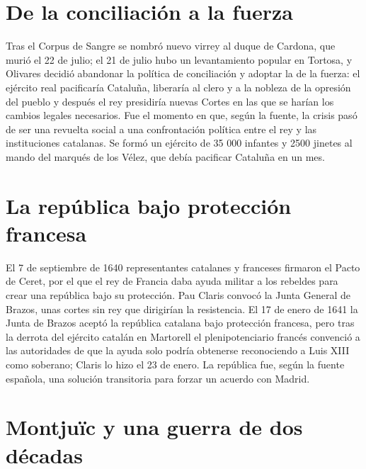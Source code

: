 \documentclass{book}
\begin{document}

\section{De la conciliación a la fuerza}

Tras el Corpus de Sangre se nombró nuevo virrey al duque de Cardona, que murió el 22 de julio; el 21 de julio hubo un levantamiento popular en Tortosa, y Olivares decidió abandonar la política de conciliación y adoptar la de la fuerza: el ejército real pacificaría Cataluña, liberaría al clero y a la nobleza de la opresión del pueblo y después el rey presidiría nuevas Cortes en las que se harían los cambios legales necesarios. Fue el momento en que, según la fuente, la crisis pasó de ser una revuelta social a una confrontación política entre el rey y las instituciones catalanas. Se formó un ejército de 35 000 infantes y 2500 jinetes al mando del marqués de los Vélez, que debía pacificar Cataluña en un mes.


\section{La república bajo protección francesa}

El 7 de septiembre de 1640 representantes catalanes y franceses firmaron el Pacto de Ceret, por el que el rey de Francia daba ayuda militar a los rebeldes para crear una república bajo su protección. Pau Claris convocó la Junta General de Brazos, unas cortes sin rey que dirigirían la resistencia. El 17 de enero de 1641 la Junta de Brazos aceptó la república catalana bajo protección francesa, pero tras la derrota del ejército catalán en Martorell el plenipotenciario francés convenció a las autoridades de que la ayuda solo podría obtenerse reconociendo a Luis XIII como soberano; Claris lo hizo el 23 de enero. La república fue, según la fuente española, una solución transitoria para forzar un acuerdo con Madrid.


\section{Montjuïc y una guerra de dos décadas}
\end{document}
